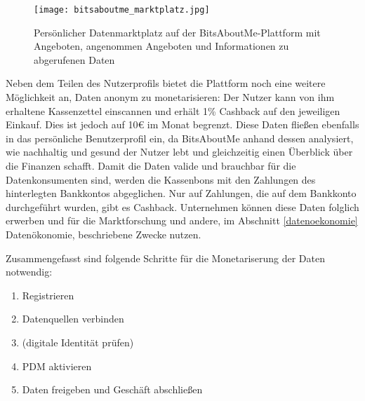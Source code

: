 \begin{figure}[!ht]
	\centering
	\texttt{[image: bitsaboutme\_marktplatz.jpg]}
	\caption{Persönlicher Datenmarktplatz auf der BitsAboutMe-Plattform mit Angeboten, angenommen Angeboten und Informationen zu abgerufenen Daten}
	\label{fig:bitsaboutmeMarktplatz}
\end{figure}
\FloatBarrier

\noindent Neben dem Teilen des Nutzerprofils bietet die Plattform noch eine weitere Möglichkeit an, Daten anonym zu monetarisieren: Der Nutzer kann von ihm erhaltene Kassenzettel einscannen und erhält 1\% Cashback auf den jeweiligen Einkauf. Dies ist jedoch auf 10€ im Monat begrenzt. Diese Daten fließen ebenfalls in das persönliche Benutzerprofil ein, da BitsAboutMe anhand dessen analysiert, wie nachhaltig und gesund der Nutzer lebt und gleichzeitig einen Überblick über die Finanzen schafft. Damit die Daten valide und brauchbar für die Datenkonsumenten sind, werden die Kassenbons mit den Zahlungen des hinterlegten Bankkontos abgeglichen. Nur auf Zahlungen, die auf dem Bankkonto durchgeführt wurden, gibt es Cashback. Unternehmen können diese Daten folglich erwerben und für die Marktforschung und andere, im Abschnitt \ref{datenoekonomie} Datenökonomie, beschriebene Zwecke nutzen. \newline

\noindent Zusammengefasst sind folgende Schritte für die Monetariserung der Daten notwendig:
\begin{enumerate}
	\item Registrieren
	\item Datenquellen verbinden
	\item (digitale Identität prüfen)
	\item PDM aktivieren
	\item Daten freigeben und Geschäft abschließen
\end{enumerate}